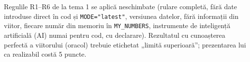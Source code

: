 \section{}
%
{Regulile R1--R6 de la tema 1 se aplică neschimbate (rulare completă, fără date introduse direct în cod și \texttt{MODE="latest"}, versiunea datelor, fără informații din viitor, fiecare număr din memoriu în \texttt{MY\_NUMBERS},
instrumente de inteligență artificială (AI) numai pentru cod, cu declarare). Rezultatul cu cunoașterea perfectă a viitorului (oracol) trebuie etichetat „limită superioară''; prezentarea lui ca realizabil costă 5 puncte.}
